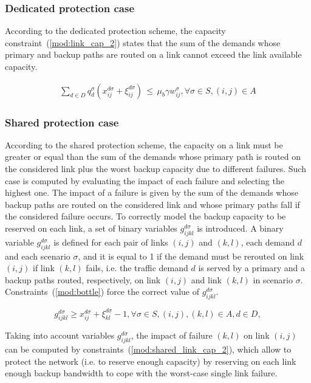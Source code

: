 \documentclass[final,5p,times,twocolumn]{elsarticle}
\begin{document}
\subsubsection{Dedicated protection case}
 
According to the dedicated protection scheme, the capacity constraint~(\ref{mod:link_cap_2}) states that the sum of the demands whose primary and backup paths are routed on a link cannot exceed the link available capacity.

\begin{eqnarray}
\label{mod:link_cap_2}\sum_{d \in D} q_d^{\sigma} 
\left(x_{ij}^{d \sigma} + \xi_{ij}^{d \sigma}\right)\,\leq\, \mu_b \gamma w_{ij}^{\sigma}, \forall \sigma \in S, (i,j) \in A 
\end{eqnarray}



\subsubsection{Shared protection case}
According to the shared protection scheme, the capacity on a link must be greater or equal than the sum of the demands whose primary path is routed on the considered link plus the worst backup capacity due to different failures. Such case is computed by evaluating the impact of each failure and selecting the highest one. The impact of a failure is given by the sum of the demands whose backup paths are routed on the considered link and whose primary paths fall if the considered failure occurs.
To correctly model the backup capacity to be reserved on each link, a set of binary variables $g_{ijkl}^{d \sigma}$ is introduced. A binary variable $g_{ijkl}^{d \sigma}$ is defined for each pair of links $(i,j)$ and $(k,l)$, each demand $d$ and each scenario $\sigma$, and it is equal to 1 if the demand must be rerouted on link $(i,j)$ if link $(k,l)$ fails, i.e. the traffic demand $d$ is served by a primary and a backup paths routed, respectively, on link $(i,j)$ and link $(k,l)$ in scenario $\sigma$. Constraints~(\ref{mod:bottle}) force the correct value of $g_{ijkl}^{d \sigma}$.

\begin{equation}\label{mod:bottle}
g_{ijkl}^{d \sigma} \geq x_{ij}^{d \sigma}+ \xi_{kl}^{d \sigma} - 1, \forall \sigma \in S, (i,j), (k,l) \in A,  d \in D, 
\end{equation}

Taking into account variables $g_{ijkl}^{d \sigma}$, the impact of failure  $(k,l)$ on link $(i,j)$ can be computed by constraints~(\ref{mod:shared_link_cap_2}), which allow to protect the network (i.e. to reserve enough capacity) by reserving on each link enough backup bandwidth to cope with the worst-case single link failure.
\end{document}
